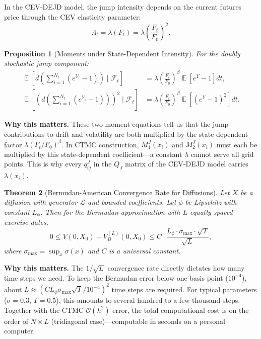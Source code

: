 \documentclass[11pt,a4paper,openany]{book}
\theoremstyle{definition}
\theoremstyle{plain}
\newtheorem{theorem}{Theorem}[chapter]
\newtheorem{proposition}[theorem]{Proposition}
\theoremstyle{remark}
\DeclareMathOperator{\E}{\mathbb{E}}
\newcommand{\1}{\mathbbm{1}}
\newcommand{\F}{\mathcal{F}}
\newcommand{\calL}{\mathcal{L}}
\begin{document}
In the CEV-DEJD model, the jump intensity depends on the current futures price through the CEV elasticity parameter:
\[
\Lambda_{t} = \lambda(F_{t}) = \lambda \left(\frac{F_{t}}{F_{0}}\right)^{\beta}.
\]

\begin{proposition}[Moments under State-Dependent Intensity]
For the doubly stochastic jump component:
\[
\begin{aligned}
\E\left[d\left(\sum_{i=1}^{N_{t}} (e^{Y_{i}} - 1)\right) \mid \F_{t}\right] &= \lambda\left(\frac{F_{t}}{F_{0}}\right)^{\beta} \E[e^{Y} - 1] dt, \\[4pt]
\E\left[\left(d\left(\sum_{i=1}^{N_{t}} (e^{Y_{i}} - 1)\right)\right)^{2} \mid \F_{t}\right] &= \lambda\left(\frac{F_{t}}{F_{0}}\right)^{\beta} \E[(e^{Y} - 1)^{2}] dt.
\end{aligned}
\]
\end{proposition}

\medskip
\noindent\textbf{Why this matters.} These two moment equations tell us that the jump contributions to drift and volatility are both multiplied by the state-dependent factor $\lambda (F_t/F_0)^\beta$. In CTMC construction, $M_1^J(x_i)$ and $M_2^J(x_i)$ must each be multiplied by this state-dependent coefficient---a constant $\lambda$ cannot serve all grid points. This is why every $q_{ij}^J$ in the $Q_J$ matrix of the CEV-DEJD model carries $\lambda(x_i)$.

\begin{theorem}[Bermudan-American Convergence Rate for Diffusions]
Let $X$ be a diffusion with generator $\calL$ and bounded coefficients. Let $\phi$ be Lipschitz with constant $L_{\phi}$. Then for the Bermudan approximation with $L$ equally spaced exercise dates,
\[
0 \leq V(0, X_{0}) - V_{B}^{(L)}(0, X_{0}) \leq C \cdot \frac{L_{\phi} \cdot \sigma_{\max} \cdot \sqrt{T}}{\sqrt{L}},
\]
where $\sigma_{\max} = \sup_{x} \sigma(x)$ and $C$ is a universal constant.
\end{theorem}

\medskip
\noindent\textbf{Why this matters.} The $1/\sqrt{L}$ convergence rate directly dictates how many time steps we need. To keep the Bermudan error below one basis point ($10^{-4}$), about $L \approx (C L_{\phi} \sigma_{\max} \sqrt{T} / 10^{-4})^2$ time steps are required. For typical parameters ($\sigma = 0.3$, $T = 0.5$), this amounts to several hundred to a few thousand steps. Together with the CTMC $\mathcal{O}(h^2)$ error, the total computational cost is on the order of $N \times L$ (tridiagonal case)---computable in seconds on a personal computer.
\end{document}

